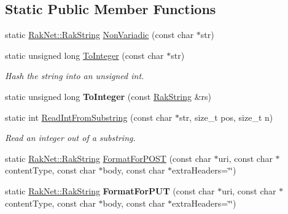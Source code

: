 \subsection*{Static Public Member Functions}
\begin{DoxyCompactItemize}
\item 
static \hyperlink{class_rak_net_1_1_rak_string}{Rak\-Net\-::\-Rak\-String} \hyperlink{class_rak_net_1_1_rak_string_a6220f7e457fda28d722c83ee95d9baa9}{Non\-Variadic} (const char $\ast$str)
\item 
\hypertarget{class_rak_net_1_1_rak_string_a79f546baedf74c64a820297b40590250}{static unsigned long \hyperlink{class_rak_net_1_1_rak_string_a79f546baedf74c64a820297b40590250}{To\-Integer} (const char $\ast$str)}\label{class_rak_net_1_1_rak_string_a79f546baedf74c64a820297b40590250}

\begin{DoxyCompactList}\small\item\em Hash the string into an unsigned int. \end{DoxyCompactList}\item 
\hypertarget{class_rak_net_1_1_rak_string_ac70a6e876d8f6c880e75b09fa7fec02d}{static unsigned long {\bfseries To\-Integer} (const \hyperlink{class_rak_net_1_1_rak_string}{Rak\-String} \&rs)}\label{class_rak_net_1_1_rak_string_ac70a6e876d8f6c880e75b09fa7fec02d}

\item 
static int \hyperlink{class_rak_net_1_1_rak_string_a166a8fe6c76012b07027f15b331df79e}{Read\-Int\-From\-Substring} (const char $\ast$str, size\-\_\-t pos, size\-\_\-t n)
\begin{DoxyCompactList}\small\item\em Read an integer out of a substring. \end{DoxyCompactList}\item 
static \hyperlink{class_rak_net_1_1_rak_string}{Rak\-Net\-::\-Rak\-String} \hyperlink{class_rak_net_1_1_rak_string_a579954736686dae1626bf7d882554e73}{Format\-For\-P\-O\-S\-T} (const char $\ast$uri, const char $\ast$content\-Type, const char $\ast$body, const char $\ast$extra\-Headers=\char`\"{}\char`\"{})
\item 
\hypertarget{class_rak_net_1_1_rak_string_a48243e98371680431a163dd82323e2ae}{static \hyperlink{class_rak_net_1_1_rak_string}{Rak\-Net\-::\-Rak\-String} {\bfseries Format\-For\-P\-U\-T} (const char $\ast$uri, const char $\ast$content\-Type, const char $\ast$body, const char $\ast$extra\-Headers=\char`\"{}\char`\"{})}\label{class_rak_net_1_1_rak_string_a48243e98371680431a163dd82323e2ae}


\end{DoxyCompactItemize}
